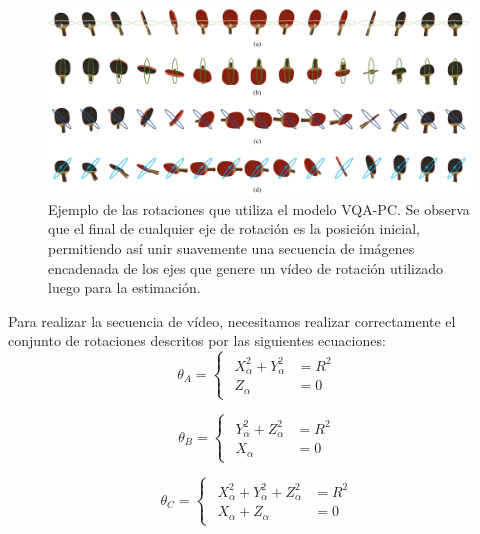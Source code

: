 \begin{figure}
  \begin{center}
    \includegraphics[width=.95\textwidth]{imagenes/chapter4/VQARotation}
  \end{center}
  \caption[Ejemplo de las rotaciones que utiliza el modelo VQA-PC.]
  {Ejemplo de las rotaciones que utiliza el modelo VQA-PC.
  Se observa que el final de cualquier eje de rotación es la posición inicial, 
permitiendo así unir suavemente una secuencia de imágenes encadenada de los ejes 
que genere un vídeo de rotación utilizado luego para la estimación.}
  \label{fig:VQARotation}
\end{figure}

Para realizar la secuencia de vídeo, necesitamos realizar correctamente 
el conjunto de rotaciones descritos por las siguientes ecuaciones: 
\begin{equation}
  \theta_A = 
\begin{cases}
\begin{aligned}
   X_\alpha^2 + Y_\alpha^2 & = R^2 \\ 
    Z_\alpha & = 0 
\end{aligned}
\end{cases}
\label{eq:RotationA}
\end{equation}

\begin{equation}
  \theta_B = 
\begin{cases}
\begin{aligned}
   Y_\alpha^2 + Z_\alpha^2 & = R^2 \\ 
    X_\alpha & = 0 
\end{aligned}
\end{cases}
\label{eq:RotationB}
\end{equation}

\begin{equation}
  \theta_C = 
\begin{cases}
\begin{aligned}
   X_\alpha^2 + Y_\alpha^2 + Z_\alpha^2 & = R^2 \\ 
    X_\alpha + Z_\alpha & = 0 
\end{aligned}
\end{cases}
\label{eq:RotationC}
\end{equation}

